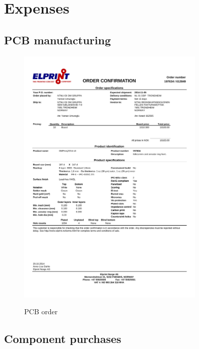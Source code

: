 \documentclass[../main/report.tex]{subfiles}
\begin{document}
\chapter{Expenses}

\newpage

\section{PCB manufacturing}

\begin{figure}[H]
    \centering
    \includegraphics[width=0.8\textwidth]{../appendix/assets/pcb-purchase.pdf}
    \label{fig:pcb-order}
    \caption{PCB order}
\end{figure}


\section{Component purchases}
\end{document}
